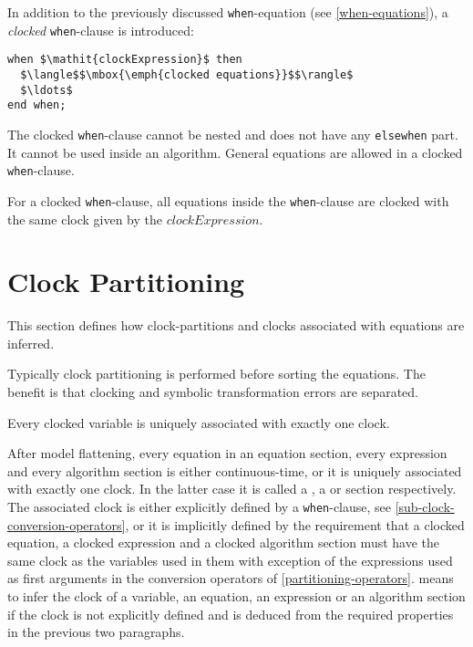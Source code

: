 In addition to the previously discussed \lstinline!when!-equation (see \cref{when-equations}), a \emph{clocked} \lstinline!when!-clause is introduced:
\begin{lstlisting}[language=modelica]
when $\mathit{clockExpression}$ then
  $\langle$$\mbox{\emph{clocked equations}}$$\rangle$
  $\ldots$
end when;
\end{lstlisting}

The clocked \lstinline!when!-clause cannot be nested and does not have any \lstinline!elsewhen! part.
It cannot be used inside an algorithm.
General equations are allowed in a clocked \lstinline!when!-clause.

For a clocked \lstinline!when!-clause, all equations inside the \lstinline!when!-clause are clocked with the same clock given by the $\mathit{clockExpression}$.

\section{Clock Partitioning}\label{clock-partitioning}

This section defines how clock-partitions and clocks associated with
equations are inferred.

\begin{nonnormative}
Typically clock partitioning is performed before sorting the equations.
The benefit is that clocking and symbolic transformation errors are separated.
\end{nonnormative}

Every clocked variable is uniquely associated with exactly one clock.

After model flattening, every equation in an equation section, every expression and every algorithm section is either continuous-time, or it is uniquely associated with exactly one clock.
In the latter case it is called a , a  or  section respectively.
The associated clock is either explicitly defined by a \lstinline!when!-clause, see \cref{sub-clock-conversion-operators}, or it is implicitly defined by the requirement that a clocked equation, a clocked expression and a clocked algorithm section must have the same clock as the variables used in them with exception of the expressions used as first arguments in the conversion operators of \cref{partitioning-operators}.
 means to infer the clock of a variable, an equation, an expression or an algorithm section if the clock is not explicitly defined and is deduced from the required properties in the previous two paragraphs.

